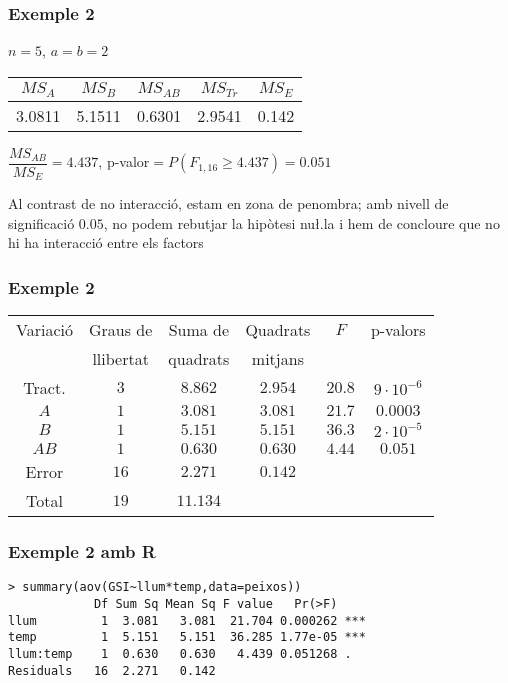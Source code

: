 \documentclass[12pt,t]{beamer}
\renewcommand{\geq}{\geqslant}
\theoremstyle{plain}
\theoremstyle{definition}
\begin{document}
\begin{frame}
\frametitle{Exemple 2}
$n=5$, $a=b=2$
\medskip

\begin{center}
\begin{tabular}{ccccc}
$MS_A$ & $MS_B$ & $MS_{AB}$ & $MS_{Tr}$ & $MS_E$\\ \hline
3.0811  &  5.1511 & 0.6301 & 2.9541 & 0.142
\end{tabular}
\end{center}
\bigskip


$\dfrac{MS_{AB}}{MS_E}=4.437$,  p-valor$=P(F_{1,16}\geq 4.437)=0.051$
\medskip

Al contrast de no interacció, estam en zona de penombra;  amb nivell de significació $0.05$, no podem rebutjar la hipòtesi nu\l.la i hem de concloure que no hi ha interacció entre els factors

\end{frame}




\begin{frame}
\frametitle{Exemple 2}
{\small
\begin{center}
\begin{tabular}{|c|c|c|c|c|c|}
\hline
Variació&Graus de&Suma de&Quadrats& $F$ & p-valors\\
&llibertat&quadrats&mitjans& &\\\hline
Tract.&$3$&$8.862$&$2.954$&$20.8$ & $9\cdot 10^{-6}$ \\
$A$&$1$&$3.081$&$3.081$&$21.7$ & $0.0003$\\
$B$&$1$&$5.151$&$5.151$&$36.3$ & $2\cdot 10^{-5}$\\
$AB$&$1$&$0.630$&$0.630$&$4.44$ & $0.051$\\
Error&$16$&$2.271$&$0.142$& &\\\hline
Total&$19$&$11.134$&& &\\\hline
\end{tabular}
\end{center}
}
\end{frame}


\begin{frame}[fragile]
\frametitle{Exemple 2 amb R}

{\small \begin{verbatim}
> summary(aov(GSI~llum*temp,data=peixos))
            Df Sum Sq Mean Sq F value   Pr(>F)    
llum         1  3.081   3.081  21.704 0.000262 ***
temp         1  5.151   5.151  36.285 1.77e-05 ***
llum:temp    1  0.630   0.630   4.439 0.051268 .  
Residuals   16  2.271   0.142                     
\end{verbatim}
}

\end{frame}
\end{document}

